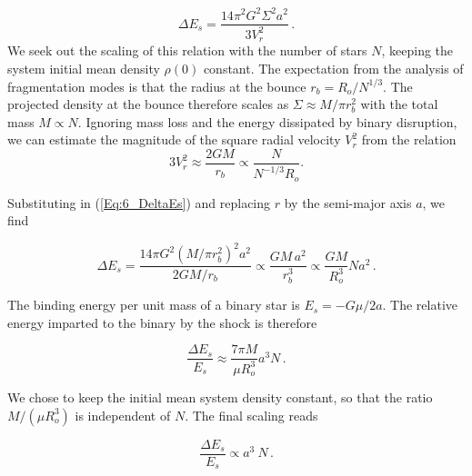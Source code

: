 \begin{equation}
\label{Eq:6_DeltaEs}
\Delta E_s = \frac{14 \pi^2 G^2 \Sigma^2 a^2}{3 V_r^2}\, .
\end{equation}
We seek out the scaling of this relation with the number of stars $N$, keeping the system initial mean density $\rho(0)$ constant.  The expectation from the analysis of fragmentation modes is that the radius at the bounce $r_b = R_o / N^{1/3}$. The projected density at the bounce therefore scales as $\Sigma \approx M / \pi r_b^2 $ with the total mass $M \propto N$. Ignoring mass loss and the energy dissipated by binary disruption, we can estimate the magnitude of the square radial velocity $V_r^2$ from the relation 
\begin{equation}
3 V_r^2 \approx \frac{2G M}{r_b} \propto \frac{N}{N^{-1/3} R_o}.
\end{equation}

Substituting in (\ref{Eq:6_DeltaEs}) and replacing $r$ by the semi-major axis $a$, we find 

\begin{equation}
\Delta E_s =  \frac{14\pi G^2 ( M / \pi r_b^2 )^2 a^2}{ 2GM / r_b } \propto \frac{G M \, a^2}{r_b^3} \propto \frac{GM}{R_o^3} N a^2\, .
\end{equation}

The binding energy per unit mass of a binary star is $E_s = - G \mu / 2 a $. The relative energy imparted to the binary by the shock is therefore 

\begin{equation}
\frac{\Delta E_s }{E_s} \approx \frac{7\pi M}{\mu R_o^3} a^3 N    \, . 
\end{equation}

We chose to keep the initial mean system density constant, so that the ratio $ M/( \mu R_o^3)$ is independent of $N$. The final scaling reads  
  
\begin{equation}
\frac{\Delta E_s}{E_s}  \propto a^3 ~ N \, .
\end{equation}

